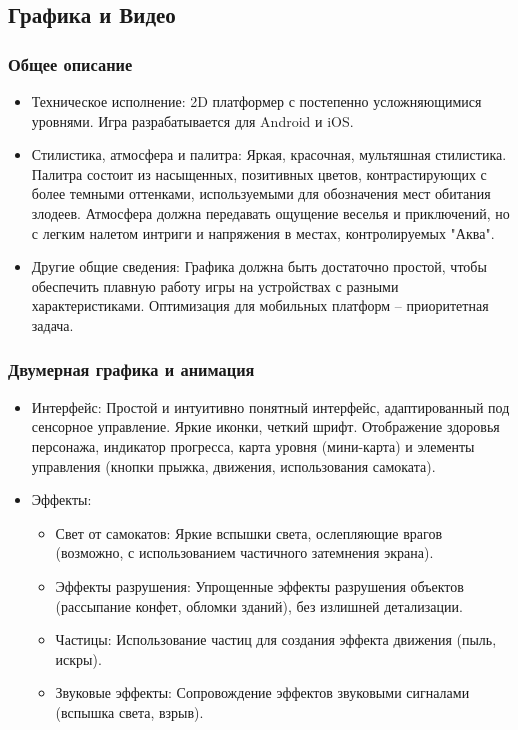 \documentclass[article,12pt, fleqn]{article}
\begin{document}
\begin{itemize}
\subsection{Графика и Видео}
\subsubsection{Общее описание}
\begin{itemize}
    \item Техническое исполнение: 
            2D платформер с постепенно усложняющимися уровнями. Игра разрабатывается для Android и iOS.
    \item Стилистика, атмосфера и палитра: 
            Яркая, красочная, мультяшная стилистика. Палитра состоит из насыщенных, позитивных цветов, контрастирующих с более темными оттенками, используемыми для обозначения мест обитания злодеев. Атмосфера должна передавать ощущение веселья и приключений, но с легким налетом интриги и напряжения в местах, контролируемых "Аква".
    \item Другие общие сведения: 
            Графика должна быть достаточно простой, чтобы обеспечить плавную работу игры на устройствах с разными характеристиками. Оптимизация для мобильных платформ – приоритетная задача.
\end{itemize}
\subsubsection{Двумерная графика и анимация}
\begin{itemize}
    \item Интерфейс: Простой и интуитивно понятный интерфейс, адаптированный под сенсорное управление. Яркие иконки, четкий шрифт. Отображение здоровья персонажа, индикатор прогресса, карта уровня (мини-карта) и элементы управления (кнопки прыжка, движения, использования самоката).
    \item Эффекты:
    \begin{itemize}
        \item Свет от самокатов: Яркие вспышки света, ослепляющие врагов (возможно, с использованием частичного затемнения экрана).
        \item Эффекты разрушения: Упрощенные эффекты разрушения объектов (рассыпание конфет, обломки зданий), без излишней детализации.
        \item Частицы: Использование частиц для создания эффекта движения (пыль, искры).
        \item Звуковые эффекты: Сопровождение эффектов звуковыми сигналами (вспышка света, взрыв).
    \end{itemize}


\end{itemize}
\end{itemize}
\end{document}
